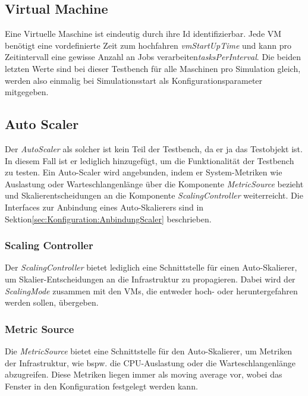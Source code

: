 \newpage

\subsection{Virtual Machine}
\label{sec:aufbau:VM}
Eine Virtuelle Maschine ist eindeutig durch ihre Id identifizierbar. Jede VM benötigt eine vordefinierte Zeit zum hochfahren \textit{vmStartUpTime} und kann pro Zeitintervall eine gewisse Anzahl an Jobs verarbeiten\textit{tasksPerInterval}. Die beiden letzten Werte sind bei dieser Testbench für alle Maschinen pro Simulation gleich, werden also einmalig bei Simulationsstart als Konfigurationsparameter mitgegeben.





\subsection{Auto Scaler}
Der \textit{AutoScaler} als solcher ist kein Teil der Testbench, da er ja das Testobjekt ist. In diesem Fall ist er lediglich hinzugefügt, um die Funktionalität der Testbench zu testen. Ein Auto-Scaler wird angebunden, indem er System-Metriken wie Auslastung oder Warteschlangenlänge über die Komponente \textit{MetricSource} bezieht und Skalierentscheidungen an die Komponente \textit{ScalingController} weiterreicht. Die Interfaces zur Anbindung eines Auto-Skalierers sind in Sektion\ref{sec:Konfiguration:AnbindungScaler} beschrieben.



\subsubsection{Scaling Controller}
Der \textit{ScalingController} bietet lediglich eine Schnittstelle für einen Auto-Skalierer, um Skalier-Entscheidungen an die Infrastruktur zu propagieren. Dabei wird der \textit{ScalingMode} zusammen mit den VMs, die entweder hoch- oder heruntergefahren werden sollen, übergeben.


\subsubsection{Metric Source}
Die \textit{MetricSource} bietet eine Schnittstelle für den Auto-Skalierer, um Metriken der Infrastruktur, wie bspw. die CPU-Auslastung oder die Warteschlangenlänge abzugreifen. Diese Metriken liegen immer als moving average vor, wobei das Fenster in den Konfiguration festgelegt werden kann.



